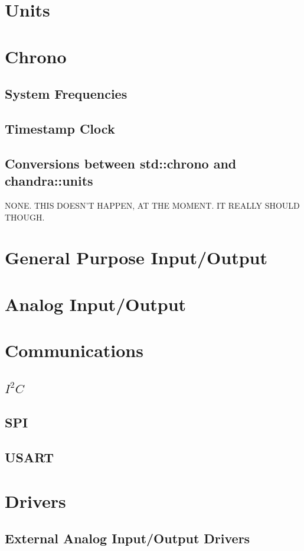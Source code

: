 \documentclass[10pt,letterpaper]{memoir} %
\newcommand{\iic}[0]{$I^{2}C$}
\begin{document}
\chapter{Units}

\chapter{Chrono}
\section{System Frequencies}
\section{Timestamp Clock}
\section{Conversions between std::chrono and chandra::units}
NONE.  THIS DOESN'T HAPPEN, AT THE MOMENT.  IT REALLY SHOULD THOUGH.

\chapter{General Purpose Input/Output}

\chapter{Analog Input/Output}

\chapter{Communications}
\section{\iic}
\section{SPI}
\section{USART}

\chapter{Drivers}
\section{External Analog Input/Output Drivers}
\end{document}
